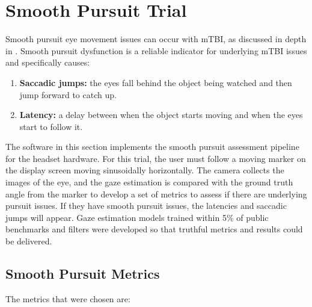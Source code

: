 \section{Smooth Pursuit Trial}

Smooth pursuit eye movement issues can occur with mTBI, as discussed in depth in . Smooth pursuit dysfunction is a reliable indicator for underlying mTBI issues and specifically causes:

\begin{enumerate}
    \item \textbf{Saccadic jumps:} the eyes fall behind the object being watched and then jump forward to catch up.
    \item \textbf{Latency:} a delay between when the object starts moving and when the eyes start to follow it.
\end{enumerate}

The software in this section implements the smooth pursuit assessment pipeline for the headset hardware. For this trial, the user must follow a moving marker on the display screen moving sinusoidally horizontally. The camera collects the images of the eye, and the gaze estimation is compared with the ground truth angle from the marker to develop a set of metrics to assess if there are underlying pursuit issues. If they have smooth pursuit issues, the latencies and saccadic jumps will appear. Gaze estimation models trained within 5\% of public benchmarks and filters were developed so that truthful metrics and results could be delivered.

\subsection{Smooth Pursuit Metrics}

The metrics that were chosen are:

